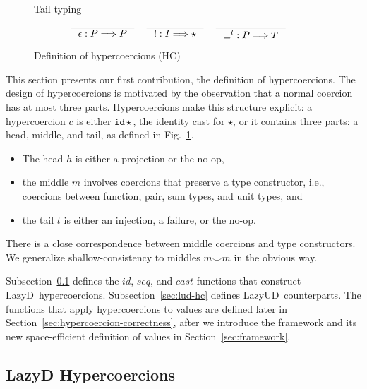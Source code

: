 \documentclass[acmsmall,review]{acmart}\settopmatter{printfolios=true,printccs=false,printacmref=false}
\newcommand{\figref}[1]{Fig.~\ref{#1}}
\newcommand{\lazyUD}{Lazy\;UD}
\newcommand{\lazyD}{Lazy\;D}
\newcommand{\TOOdyn}[0]{\star}
\newcommand{\typingHC}[3]{#1 : #2 \Longrightarrow #3}
\newcommand{\hyperCoercionI}[0]{\mathtt{id\star}}
\begin{document}
\begin{figure}
    Tail typing \fbox{$\typingHC{t}{P}{T}$}
    \begin{gather*}
    \inference{}{\typingHC{\epsilon}{P}{P}} \quad
    \inference{}{\typingHC{!}{I}{\TOOdyn}} \quad
    \inference{}{\typingHC{\bot^l}{P}{T}} \quad
    \end{gather*}
  
  \caption{Definition of hypercoercions (HC)}
  \label{fig:hypercoercion}
\end{figure}

This section presents our first contribution, the definition of
hypercoercions.  The design of hypercoercions is motivated by the
observation that a normal coercion has at most three
parts. Hypercoercions make this structure explicit: a hypercoercion $c$ is
either $\hyperCoercionI$, the identity cast for $\TOOdyn$, or it contains
three parts: a head, middle, and tail, as defined in
\figref{fig:hypercoercion}.
\begin{itemize}
\item The head $h$ is either a projection or the no-op,
\item the middle $m$ involves coercions that preserve a type
  constructor, i.e., coercions between function, pair, sum types, and
  unit types, and
\item the tail $t$ is either an injection, a failure, or the no-op.
\end{itemize}
There is a close correspondence between middle coercions and type
constructors.  We generalize shallow-consistency to middles $m \smile
m$ in the obvious way.

Subsection~\ref{sec:ld-hc} defines the $id$, $seq$, and $cast$
functions that construct
\lazyD\ hypercoercions. Subsection~\ref{sec:lud-hc} defines
\lazyUD\ counterparts.  The functions that apply hypercoercions to
values are defined later in
Section~\ref{sec:hypercoercion-correctness}, after we introduce the framework 
and its new space-efficient definition of values in Section~\ref{sec:framework}.

\subsection{\lazyD{} Hypercoercions}
\label{sec:ld-hc}
\end{document}
